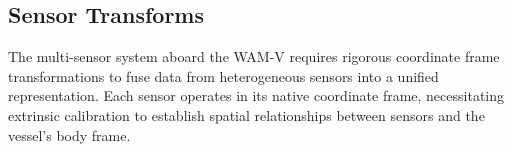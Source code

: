 \documentclass{erauthesis}
\begin{document}





\subsection{Sensor Transforms}
The multi-sensor system aboard the WAM-V requires rigorous coordinate frame transformations to fuse data from heterogeneous sensors into a unified representation. Each sensor operates in its native coordinate frame, necessitating extrinsic calibration to establish spatial relationships between sensors and the vessel's body frame.
\end{document}
